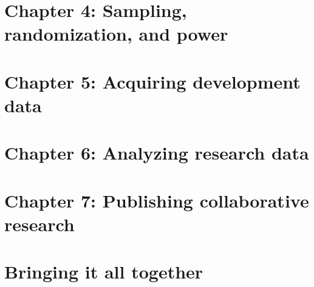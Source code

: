 


\chapter{Chapter 4: Sampling, randomization, and power}
\label{ch:4}




\chapter{Chapter 5: Acquiring development data}
\label{ch:5}




\chapter{Chapter 6: Analyzing research data}
\label{ch:6}




\chapter{Chapter 7: Publishing collaborative research}
\label{ch:7}




\chapter{Bringing it all together}

